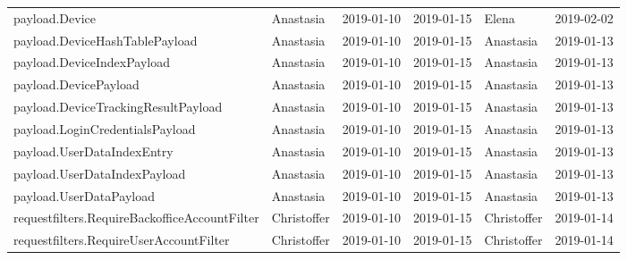 \begin{adjustbox}{totalheight=\baselineskip}
\begin{tabular}{ l l r r l r }
payload.Device & Anastasia & 2019-01-10 & 2019-01-15 & Elena & 2019-02-02 \\
payload.DeviceHashTablePayload & Anastasia & 2019-01-10 & 2019-01-15 & Anastasia & 2019-01-13 \\
payload.DeviceIndexPayload & Anastasia & 2019-01-10 & 2019-01-15 & Anastasia & 2019-01-13 \\
payload.DevicePayload & Anastasia & 2019-01-10 & 2019-01-15 & Anastasia & 2019-01-13 \\
payload.DeviceTrackingResultPayload & Anastasia & 2019-01-10 & 2019-01-15 & Anastasia & 2019-01-13 \\
payload.LoginCredentialsPayload & Anastasia & 2019-01-10 & 2019-01-15 & Anastasia & 2019-01-13 \\
payload.UserDataIndexEntry & Anastasia & 2019-01-10 & 2019-01-15 & Anastasia & 2019-01-13 \\
payload.UserDataIndexPayload & Anastasia & 2019-01-10 & 2019-01-15 & Anastasia & 2019-01-13 \\
payload.UserDataPayload & Anastasia & 2019-01-10 & 2019-01-15 & Anastasia & 2019-01-13 \\
requestfilters.RequireBackofficeAccountFilter & Christoffer & 2019-01-10 & 2019-01-15 & Christoffer & 2019-01-14 \\
requestfilters.RequireUserAccountFilter & Christoffer & 2019-01-10 & 2019-01-15 & Christoffer & 2019-01-14 \\
\end{tabular}
\end{adjustbox}
